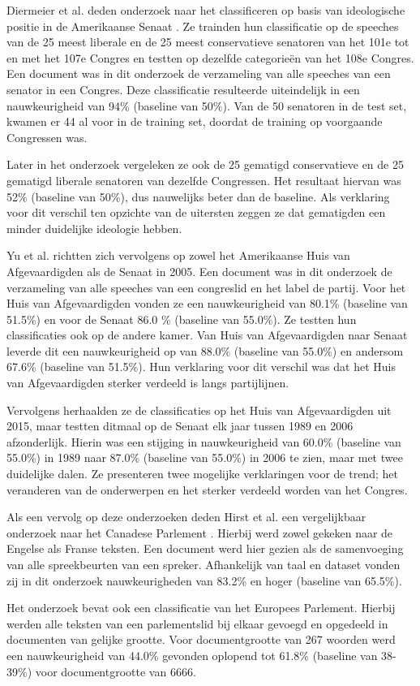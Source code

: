 Diermeier et al. deden onderzoek naar het classificeren op basis van ideologische positie in de Amerikaanse Senaat \cite{diermeier_godbout_yu_kaufmann_2012}. Ze trainden hun classificatie op de speeches van de 25 meest liberale en de 25 meest conservatieve senatoren van het 101e tot en met het 107e Congres en testten op dezelfde categorieën van het 108e Congres. Een document was in dit onderzoek de verzameling van alle speeches van een senator in een Congres. Deze classificatie resulteerde uiteindelijk in een nauwkeurigheid van 94\% (baseline van 50\%). Van de 50 senatoren in de test set, kwamen er 44 al voor in de training set, doordat de training op voorgaande Congressen was.\par
Later in het onderzoek vergeleken ze ook de 25 gematigd conservatieve  en de 25 gematigd liberale senatoren van dezelfde Congressen. Het resultaat hiervan was 52\% (baseline van 50\%), dus nauwelijks beter dan de baseline. Als verklaring voor dit verschil ten opzichte van de uitersten zeggen ze dat gematigden een minder duidelijke ideologie hebben.\par
Yu et al. \cite{doi:10.1080/19331680802149608} richtten zich vervolgens op zowel het Amerikaanse Huis van Afgevaardigden als de Senaat in 2005. Een document was in dit onderzoek de verzameling van alle speeches van een congreslid en het label de partij. Voor het Huis van Afgevaardigden vonden ze een nauwkeurigheid van 80.1\% (baseline van 51.5\%) en voor de Senaat 86.0 \% (baseline van 55.0\%). Ze testten hun classificaties ook op de andere kamer. Van Huis van Afgevaardigden naar Senaat leverde dit een nauwkeurigheid op van 88.0\% (baseline van 55.0\%) en andersom 67.6\% (baseline van 51.5\%). Hun verklaring voor dit verschil was dat het Huis van Afgevaardigden sterker verdeeld is langs partijlijnen.\par
Vervolgens herhaalden ze de classificaties op het Huis van Afgevaardigden uit 2015, maar testten ditmaal op de Senaat elk jaar tussen 1989 en 2006 afzonderlijk. Hierin was een stijging in nauwkeurigheid van 60.0\% (baseline van 55.0\%) in 1989 naar 87.0\% (baseline van 55.0\%) in 2006 te zien, maar met twee duidelijke dalen. Ze presenteren twee mogelijke verklaringen voor de trend; het veranderen van de onderwerpen en het sterker verdeeld worden van het Congres. \par
Als een vervolg op deze onderzoeken deden Hirst et al. een vergelijkbaar onderzoek naar het Canadese Parlement \cite{Hirst_textto}. Hierbij werd zowel gekeken naar de Engelse als Franse teksten. Een document werd hier gezien als de samenvoeging van alle spreekbeurten van een spreker. Afhankelijk van taal en dataset vonden zij in dit onderzoek nauwkeurigheden van 83.2\%  en hoger (baseline van 65.5\%).\par
Het onderzoek bevat ook een classificatie van het Europees Parlement. Hierbij werden alle teksten van een parlementslid bij elkaar gevoegd en opgedeeld in documenten van gelijke grootte. Voor documentgrootte van 267 woorden werd een nauwkeurigheid van 44.0\%  gevonden oplopend tot 61.8\% (baseline van 38-39\%) voor documentgrootte van 6666.\par

